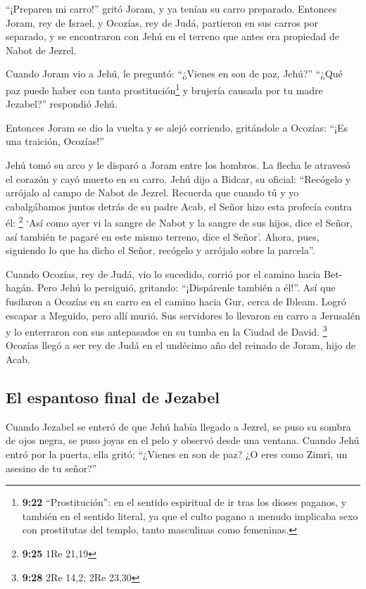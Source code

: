  ``¡Preparen mi carro!'' gritó Joram, y ya tenían su
carro preparado. Entonces Joram, rey de Israel, y Ocozías, rey de Judá,
partieron en sus carros por separado, y se encontraron con Jehú en el
terreno que antes era propiedad de Nabot de Jezrel.

 Cuando Joram vio a Jehú, le preguntó: ``¿Vienes en son
de paz, Jehú?'' ``¿Qué paz puede haber con tanta prostitución\footnote{\textbf{9:22}
  ``Prostitución'': en el sentido espiritual de ir tras los dioses
  paganos, y también en el sentido literal, ya que el culto pagano a
  menudo implicaba sexo con prostitutas del templo, tanto masculinas
  como femeninas.} y brujería causada por tu madre Jezabel?'' respondió
Jehú.

 Entonces Joram se dio la vuelta y se alejó corriendo,
gritándole a Ocozías: ``¡Es una traición, Ocozías!''

 Jehú tomó su arco y le disparó a Joram entre los
hombros. La flecha le atravesó el corazón y cayó muerto en su carro.
 Jehú dijo a Bidcar, su oficial: ``Recógelo y arrójalo al
campo de Nabot de Jezrel. Recuerda que cuando tú y yo cabalgábamos
juntos detrás de su padre Acab, el Señor hizo esta profecía contra él:
\footnote{\textbf{9:25} 1Re 21,19}  `Así como ayer vi la
sangre de Nabot y la sangre de sus hijos, dice el Señor, así también te
pagaré en este mismo terreno, dice el Señor'. Ahora, pues, siguiendo lo
que ha dicho el Señor, recógelo y arrójalo sobre la parcela''.

 Cuando Ocozías, rey de Judá, vio lo sucedido, corrió por
el camino hacia Bet-hagán. Pero Jehú lo persiguió, gritando:
``¡Dispárenle también a él!''. Así que fusilaron a Ocozías en su carro
en el camino hacia Gur, cerca de Ibleam. Logró escapar a Meguido, pero
allí murió.  Sus servidores lo llevaron en carro a
Jerusalén y lo enterraron con sus antepasados en su tumba en la Ciudad
de David. \footnote{\textbf{9:28} 2Re 14,2; 2Re 23,30} 
Ocozías llegó a ser rey de Judá en el undécimo año del reinado de Joram,
hijo de Acab.

\hypertarget{el-espantoso-final-de-jezabel}{%
\subsection{El espantoso final de
Jezabel}\label{el-espantoso-final-de-jezabel}}

 Cuando Jezabel se enteró de que Jehú había llegado a
Jezrel, se puso su sombra de ojos negra, se puso joyas en el pelo y
observó desde una ventana.  Cuando Jehú entró por la
puerta, ella gritó: ``¿Vienes en son de paz? ¿O eres como Zimri, un
asesino de tu señor?''

